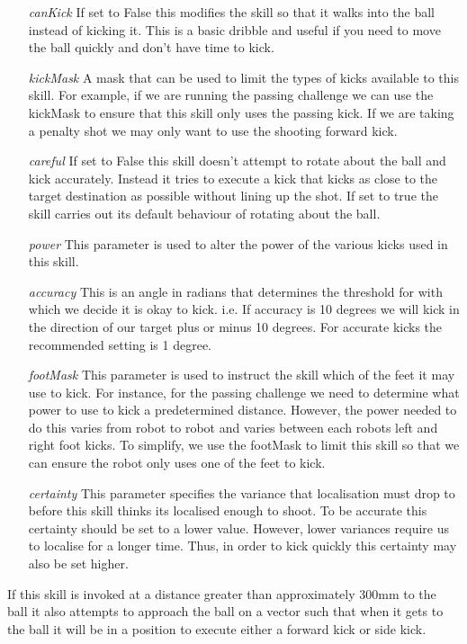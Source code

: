 \documentclass[pdftex,11pt,a4paper]{report}
\begin{document}
\begin{itemize}
\item[\emph{canKick}] If set to False this modifies the skill so that it walks into the ball instead of kicking it. This is a basic dribble and useful if you need to move the ball quickly and don't have time to kick.
\item[\emph{kickMask}] A mask that can be used to limit the types of kicks available to this skill. For example, if we are running the passing challenge we can use the kickMask to ensure that this skill only uses the passing kick. If we are taking a penalty shot we may only want to use the shooting forward kick.
\item[\emph{careful}] If set to False this skill doesn't attempt to rotate about the ball and kick accurately. Instead it tries to execute a kick that kicks as close to the target destination as possible without lining up the shot. If set to true the skill carries out its default behaviour of rotating about the ball.
\item[\emph{power}] This parameter is used to alter the power of the various kicks used in this skill.
\item[\emph{accuracy}] This is an angle in radians that determines the threshold for with which we decide it is okay to kick. i.e. If accuracy is 10 degrees we will kick in the direction of our target plus or minus 10 degrees. For accurate kicks the recommended setting is 1 degree.
\item[\emph{footMask}] This parameter is used to instruct the skill which of the feet it may use to kick. For instance, for the passing challenge we need to determine what power to use to kick a predetermined distance. However, the power needed to do this varies from robot to robot and varies between each robots left and right foot kicks. To simplify, we use the footMask to limit this skill so that we can ensure the robot only uses one of the feet to kick.
\item[\emph{certainty}] This parameter specifies the variance that localisation must drop to before this skill thinks its localised enough to shoot. To be accurate this certainty should be set to a lower value. However, lower variances require us to localise for a longer time. Thus, in order to kick quickly this certainty may also be set higher.
\end{itemize}

If this skill is invoked at a distance greater than approximately 300mm to the ball it also attempts to approach the ball on a vector such that when it gets to the ball it will be in a position to execute either a forward kick or side kick. 
\end{document}
